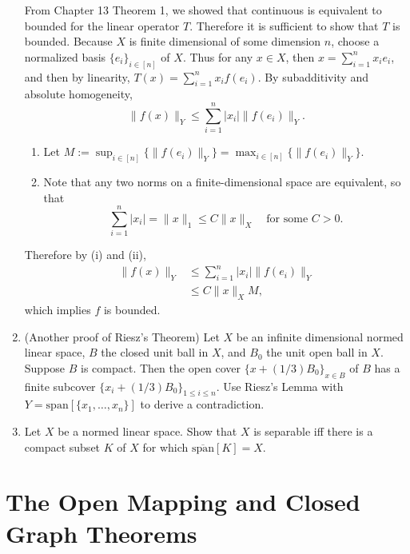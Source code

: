 \begin{enumerate}
    From Chapter 13 Theorem 1, we showed that continuous is equivalent to bounded for the linear operator $T$.
    Therefore it is sufficient to show that $T$ is bounded.
    Because $X$ is finite dimensional of some dimension $n$, choose a normalized basis $\{e_i\}_{i\in[n]}$ of $X$.
    Thus for any $x\in X$, then $x=\sum_{i=1}^nx_ie_i$, and then by linearity, $T(x)=\sum_{i=1}^nx_if(e_i)$.
    By subadditivity and absolute homogeneity,
    \[
        \|f(x)\|_Y\le\sum_{i=1}^n|x_i|\|f(e_i)\|_Y.
    \]
    \begin{enumerate}
        \item Let $M:=\sup_{i\in[n]}\{\|f(e_i)\|_Y\}=\max_{i\in[n]}\{\|f(e_i)\|_Y\}$.
        \item Note that any two norms on a finite-dimensional space are equivalent, so that 
        \[
            \sum_{i=1}^n|x_i|=\|x\|_1\le C\|x\|_X\quad\text{for some }C>0.
        \]
    \end{enumerate}
    Therefore by (i) and (ii),
    \begin{align*}
        \|f(x)\|_Y
        &\le\sum_{i=1}^n|x_i|\|f(e_i)\|_Y\\
        &\le C\|x\|_XM,
    \end{align*}
    which implies $f$ is bounded.
    \\\item (Another proof of Riesz's Theorem) Let $X$ be an infinite dimensional normed linear space, $B$ the closed unit ball in $X$, and $B_0$ the unit open ball in $X$.
    Suppose $B$ is compact.
    Then the open cover $\{x+(1/3)B_0\}_{x\in B}$ of $B$ has a finite subcover $\{x_i+(1/3)B_0\}_{1\le i\le n}$.
    Use Riesz's Lemma with $Y=\text{span}[\{x_1,\dots,x_n\}]$ to derive a contradiction.
    \\\item Let $X$ be a normed linear space.
    Show that $X$ is separable iff there is a compact subset $K$ of $X$ for which $\overline{\text{span}}[K]=X$.
\end{enumerate}

\section{The Open Mapping and Closed Graph Theorems}\


